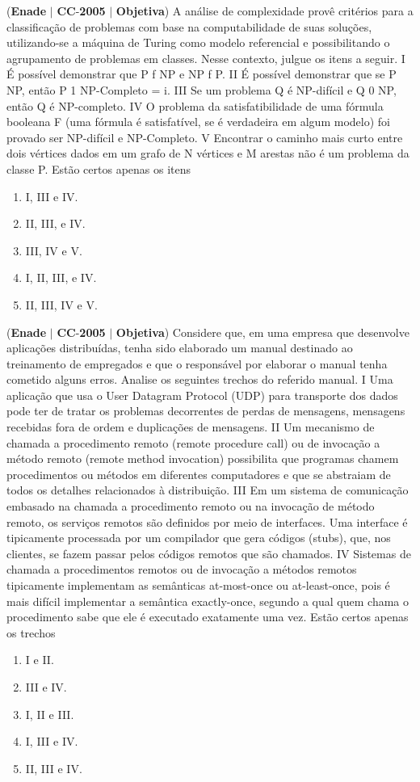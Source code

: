 \documentclass{exam}
\begin{document}
\begin{questions}
\question (\textbf{Enade} $|$ \textbf{CC}-\textbf{2005} $|$ \textbf{Objetiva})
A análise de complexidade provê critérios para a classificação
de problemas com base na computabilidade de suas soluções,
utilizando-se a máquina de Turing como modelo referencial e
possibilitando o agrupamento de problemas em classes. Nesse
contexto, julgue os itens a seguir.
I É possível demonstrar que P f NP e NP f P.
II É possível demonstrar que se P  NP, então
P 1 NP-Completo = i.
III Se um problema Q é NP-difícil e Q 0 NP, então Q é
NP-completo.
IV O problema da satisfatibilidade de uma fórmula booleana F
(uma fórmula é satisfatível, se é verdadeira em algum
modelo) foi provado ser NP-difícil e NP-Completo.
V Encontrar o caminho mais curto entre dois vértices dados
em um grafo de N vértices e M arestas não é um problema
da classe P.
Estão certos apenas os itens
	\begin{enumerate}[label=\alph*)]
		\item  I, III e IV.
		\item  II, III, e IV.
		\item  III, IV e V.
		\item  I, II, III, e IV.
		\item  II, III, IV e V.
	\end{enumerate}

\question (\textbf{Enade} $|$ \textbf{CC}-\textbf{2005} $|$ \textbf{Objetiva})
Considere que, em uma empresa que desenvolve aplicações
distribuídas, tenha sido elaborado um manual destinado ao
treinamento de empregados e que o responsável por elaborar o
manual tenha cometido alguns erros. Analise os seguintes
trechos do referido manual.
I Uma aplicação que usa o User Datagram Protocol (UDP)
para transporte dos dados pode ter de tratar os problemas
decorrentes de perdas de mensagens, mensagens recebidas
fora de ordem e duplicações de mensagens.
II Um mecanismo de chamada a procedimento remoto (remote
procedure call) ou de invocação a método remoto (remote
method invocation) possibilita que programas chamem
procedimentos ou métodos em diferentes computadores e
que se abstraiam de todos os detalhes relacionados à
distribuição.
III Em um sistema de comunicação embasado na chamada a
procedimento remoto ou na invocação de método remoto, os
serviços remotos são definidos por meio de interfaces. Uma
interface é tipicamente processada por um compilador que
gera códigos (stubs), que, nos clientes, se fazem passar pelos
códigos remotos que são chamados.
IV Sistemas de chamada a procedimentos remotos ou de
invocação a métodos remotos tipicamente implementam as
semânticas at-most-once ou at-least-once, pois é mais difícil
implementar a semântica exactly-once, segundo a qual quem
chama o procedimento sabe que ele é executado exatamente
uma vez.
Estão certos apenas os trechos
	\begin{enumerate}[label=\alph*)]
		\item  I e II.
		\item  III e IV.
		\item  I, II e III.
		\item  I, III e IV.
		\item  II, III e IV.
	\end{enumerate}


\end{questions}
\end{document}
